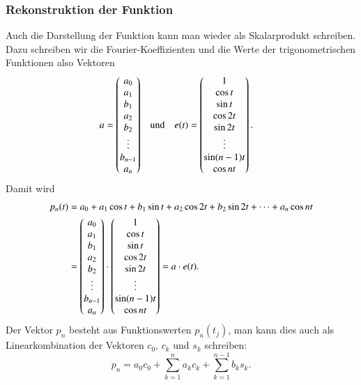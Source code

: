 \subsubsection{Rekonstruktion der Funktion}
Auch die Darstellung der Funktion kann man wieder als Skalarprodukt schreiben.
Dazu schreiben wir die Fourier-Koeffizienten und die Werte der
trigonometrischen Funktionen also Vektoren
\[
\begin{aligned}
a
&=
\begin{pmatrix}
a_0\mathstrut\\
a_1\mathstrut\\
b_1\mathstrut\\
a_2\mathstrut\\
b_2\mathstrut\\
\vdots\\
b_{n-1}\mathstrut\\
a_n\mathstrut
\end{pmatrix}
&&\text{und}
&
e(t)
&=
\begin{pmatrix}
1\\
\cos t\\
\sin t\\
\cos2t\\
\sin2t\\
\vdots\\
\sin(n-1)t\\
\cos nt
\end{pmatrix}.
\end{aligned}
\]
Damit wird 
\begin{align*}
p_n(t)
&=
a_0 + a_1\cos t + b_1\sin t + a_2\cos2t+b_2\sin2t+\dots+a_n\cos nt
\\
&=
\begin{pmatrix}
a_0\mathstrut\\
a_1\mathstrut\\
b_1\mathstrut\\
a_2\mathstrut\\
b_2\mathstrut\\
\vdots\\
b_{n-1}\mathstrut\\
a_n\mathstrut
\end{pmatrix}
\cdot
\begin{pmatrix}
1\\
\cos t\\
\sin t\\
\cos2t\\
\sin2t\\
\vdots\\
\sin(n-1)t\\
\cos nt
\end{pmatrix}
=
a\cdot e(t).
\end{align*}
Der Vektor $p_n$ besteht aus Funktionswerten $p_n(t_j)$, man kann dies
auch als Linearkombination der Vektoren $c_0$, $c_k$ und $s_k$ schreiben:
\begin{equation}
p_n = a_0c_0 + \sum_{k=1}^n a_kc_k + \sum_{k=1}^{n-1} b_ks_k.
\label{skript:fourier:pn}
\end{equation}

